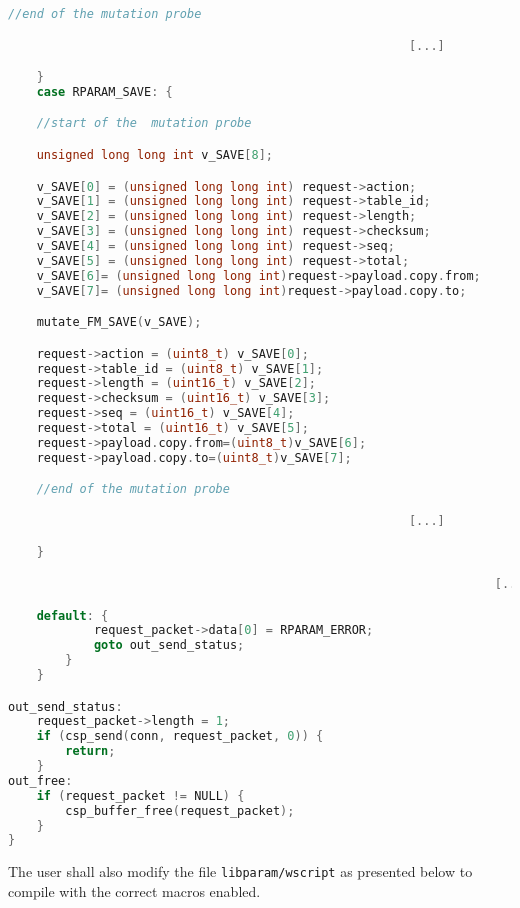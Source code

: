 \begin{lstlisting}[language=c]
    //end of the mutation probe

														[...]

	}
	case RPARAM_SAVE: {

    //start of the  mutation probe

    unsigned long long int v_SAVE[8];

    v_SAVE[0] = (unsigned long long int) request->action;
    v_SAVE[1] = (unsigned long long int) request->table_id;
    v_SAVE[2] = (unsigned long long int) request->length;
    v_SAVE[3] = (unsigned long long int) request->checksum;
    v_SAVE[4] = (unsigned long long int) request->seq;
    v_SAVE[5] = (unsigned long long int) request->total;
    v_SAVE[6]= (unsigned long long int)request->payload.copy.from;
    v_SAVE[7]= (unsigned long long int)request->payload.copy.to;

    mutate_FM_SAVE(v_SAVE);

    request->action = (uint8_t) v_SAVE[0];
    request->table_id = (uint8_t) v_SAVE[1];
    request->length = (uint16_t) v_SAVE[2];
    request->checksum = (uint16_t) v_SAVE[3];
    request->seq = (uint16_t) v_SAVE[4];
    request->total = (uint16_t) v_SAVE[5];
    request->payload.copy.from=(uint8_t)v_SAVE[6];
    request->payload.copy.to=(uint8_t)v_SAVE[7];

    //end of the mutation probe

          												[...]

	}

																	[...]

	default: {
            request_packet->data[0] = RPARAM_ERROR;
            goto out_send_status;
        }
    }

out_send_status:
    request_packet->length = 1;
    if (csp_send(conn, request_packet, 0)) {
        return;
    }
out_free:
    if (request_packet != NULL) {
        csp_buffer_free(request_packet);
    }
}
\end{lstlisting}

The user shall also modify the file \texttt{libparam/wscript} as presented below to compile with the correct macros enabled.

